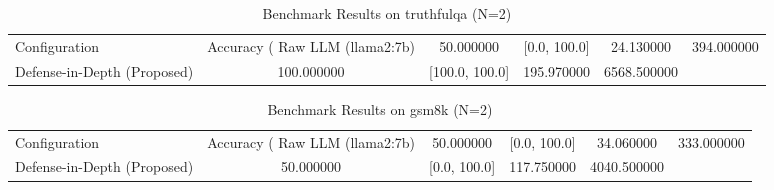 \begin{table}
\caption{Benchmark Results on truthfulqa (N=2)}
\label{tab:truthfulqa_benchmark}
\begin{tabular}{lcccc}
\toprule
Configuration & Accuracy (%
\midrule
Raw LLM (llama2:7b) & 50.000000 & [0.0, 100.0] & 24.130000 & 394.000000 \\
Defense-in-Depth (Proposed) & 100.000000 & [100.0, 100.0] & 195.970000 & 6568.500000 \\
\bottomrule
\end{tabular}
\end{table}

\begin{table}
\caption{Benchmark Results on gsm8k (N=2)}
\label{tab:gsm8k_benchmark}
\begin{tabular}{lcccc}
\toprule
Configuration & Accuracy (%
\midrule
Raw LLM (llama2:7b) & 50.000000 & [0.0, 100.0] & 34.060000 & 333.000000 \\
Defense-in-Depth (Proposed) & 50.000000 & [0.0, 100.0] & 117.750000 & 4040.500000 \\
\bottomrule
\end{tabular}
\end{table}
